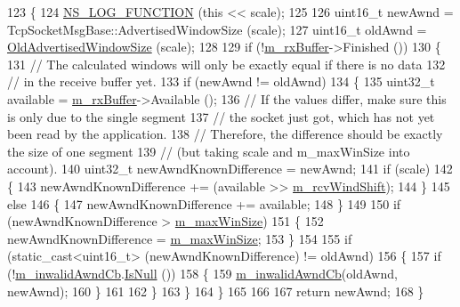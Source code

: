 \begin{DoxyCode}
123 \{
124   \hyperlink{log-macros-disabled_8h_a90b90d5bad1f39cb1b64923ea94c0761}{NS\_LOG\_FUNCTION} (\textcolor{keyword}{this} << scale);
125 
126   uint16\_t newAwnd = TcpSocketMsgBase::AdvertisedWindowSize (scale);
127   uint16\_t oldAwnd = \hyperlink{classTcpSocketAdvertisedWindowProxy_a63237b219ba5191f5f446680af53bdda}{OldAdvertisedWindowSize} (scale);
128 
129   \textcolor{keywordflow}{if} (!\hyperlink{classns3_1_1TcpSocketBase_a0163894148e5a70e6bd89970a1483fae}{m\_rxBuffer}->Finished ())
130     \{
131       \textcolor{comment}{// The calculated windows will only be exactly equal if there is no data}
132       \textcolor{comment}{// in the receive buffer yet.}
133       \textcolor{keywordflow}{if} (newAwnd != oldAwnd)
134         \{
135           uint32\_t available = \hyperlink{classns3_1_1TcpSocketBase_a0163894148e5a70e6bd89970a1483fae}{m\_rxBuffer}->Available ();
136           \textcolor{comment}{// If the values differ, make sure this is only due to the single segment}
137           \textcolor{comment}{// the socket just got, which has not yet been read by the application.}
138           \textcolor{comment}{// Therefore, the difference should be exactly the size of one segment}
139           \textcolor{comment}{// (but taking scale and m\_maxWinSize into account).}
140           uint32\_t newAwndKnownDifference = newAwnd;
141           \textcolor{keywordflow}{if} (scale)
142             \{
143               newAwndKnownDifference += (available >> \hyperlink{classns3_1_1TcpSocketBase_a045fc4c0c16f906c5ec43d853cdb599f}{m\_rcvWindShift});
144             \}
145           \textcolor{keywordflow}{else}
146             \{
147               newAwndKnownDifference += available;
148             \}
149 
150           \textcolor{keywordflow}{if} (newAwndKnownDifference > \hyperlink{classns3_1_1TcpSocketBase_a045897aa710b2ad3e99cefd66e8dc168}{m\_maxWinSize})
151             \{
152               newAwndKnownDifference = \hyperlink{classns3_1_1TcpSocketBase_a045897aa710b2ad3e99cefd66e8dc168}{m\_maxWinSize};
153             \}
154 
155           \textcolor{keywordflow}{if} (static\_cast<uint16\_t> (newAwndKnownDifference) != oldAwnd)
156             \{
157               \textcolor{keywordflow}{if} (!\hyperlink{classTcpSocketAdvertisedWindowProxy_abdfa0f5233b9dd93113a4ab6b192ddda}{m\_inwalidAwndCb}.\hyperlink{classns3_1_1Callback_aa8e27826badbf37f84763f36f70d9b54}{IsNull} ())
158                 \{
159                   \hyperlink{classTcpSocketAdvertisedWindowProxy_abdfa0f5233b9dd93113a4ab6b192ddda}{m\_inwalidAwndCb}(oldAwnd, newAwnd);
160                 \}
161 
162             \}
163         \}
164     \}
165 
166 
167   \textcolor{keywordflow}{return} newAwnd;
168 \}
\end{DoxyCode}


